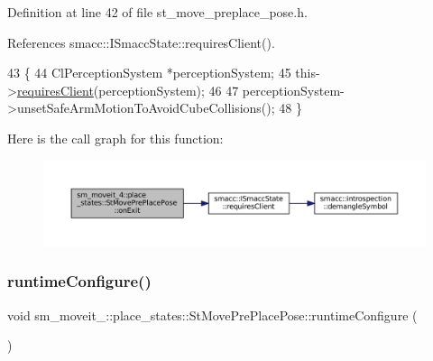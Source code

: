 Definition at line 42 of file st\+\_\+move\+\_\+preplace\+\_\+pose.\+h.



References smacc\+::\+I\+Smacc\+State\+::requires\+Client().


\begin{DoxyCode}
43             \{
44                 ClPerceptionSystem *perceptionSystem;
45                 this->\hyperlink{classsmacc_1_1ISmaccState_a7f95c9f0a6ea2d6f18d1aec0519de4ac}{requiresClient}(perceptionSystem);
46 
47                 perceptionSystem->unsetSafeArmMotionToAvoidCubeCollisions();
48             \}
\end{DoxyCode}
Here is the call graph for this function\+:
\nopagebreak
\begin{figure}[H]
\begin{center}
\leavevmode
\includegraphics[width=350pt]{structsm__moveit__4_1_1place__states_1_1StMovePrePlacePose_a4c62c5fdaa740b27f6af5c47d3507dad_cgraph}
\end{center}
\end{figure}
\mbox{\label{structsm__moveit__4_1_1place__states_1_1StMovePrePlacePose_a76aecb88d891dab05216eff868ee4ac7}} 
\subsubsection{\texorpdfstring{runtime\+Configure()}{runtimeConfigure()}}
{\footnotesize\ttfamily void sm\+\_\+moveit\+\_\+::place\+\_\+states\+::\+St\+Move\+Pre\+Place\+Pose\+::runtime\+Configure (\begin{DoxyParamCaption}{ }\end{DoxyParamCaption})\hspace{0.3cm}{\ttfamily [inline]}}



